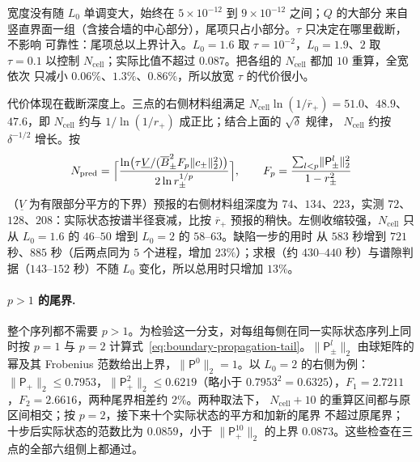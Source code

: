 
宽度没有随 $L_0$ 单调变大，始终在 $5\times10^{-12}$ 到 $9\times10^{-12}$ 之间；$Q$ 的大部分
来自竖直界面一组（含接合墙的中心部分），尾项只占小部分。$\tau$ 只决定在哪里截断，不影响
可靠性：尾项总以上界计入。$L_0=1.6$ 取 $\tau=10^{-2}$，$L_0=1.9$、$2$ 取 $\tau=0.1$ 以控制
$N_{\mathrm{cell}}$；实际比值不超过 $0.087$。把各组的 $N_{\mathrm{cell}}$ 都加 $10$ 重算，全宽依次
只减小 $0.06\%$、$1.3\%$、$0.86\%$，所以放宽 $\tau$ 的代价很小。

代价体现在截断深度上。三点的右侧材料组满足 $N_{\mathrm{cell}}\ln(1/\overline r_+)=51.0$、$48.9$、
$47.6$，即 $N_{\mathrm{cell}}$ 约与 $1/\ln(1/r_+)$ 成正比；结合上面的 $\sqrt\delta$ 规律，
$N_{\mathrm{cell}}$ 约按 $\delta^{-1/2}$ 增长。按
\[
  N_{\mathrm{pred}}=\Bigl\lceil\frac{\ln\bigl(\tau\underline V/(\overline B_\pm^2F_p\lVert c_\pm\rVert_2^2)\bigr)}{2\ln r_\pm^{1/p}}\Bigr\rceil,
  \qquad F_p=\frac{\sum_{l<p}\lVert\mathsf P_\pm^l\rVert_2^2}{1-r_\pm^2}
\]
（$\underline V$ 为有限部分平方的下界）预报的右侧材料组深度为 $74$、$134$、$223$，实测
$72$、$128$、$208$：实际状态按谱半径衰减，比按 $\overline r_+$ 预报的稍快。左侧收缩较强，$N_{\mathrm{cell}}$ 只从 $L_0=1.6$ 的 $46$--$50$ 增到 $L_0=2$ 的 $58$--$63$。缺陷一步的用时
从 $583$ 秒增到 $721$ 秒、$885$ 秒（后两点同为 $5$ 个进程，增加 $23\%$）；求根（约
$430$--$440$ 秒）与谱隙判据（$143$--$152$ 秒）不随 $L_0$ 变化，所以总用时只增加 $13\%$。

\paragraph{$p>1$ 的尾界.}
整个序列都不需要 $p>1$。为检验这一分支，对每组每侧在同一实际状态序列上同时按 $p=1$ 与
$p=2$ 计算式~\eqref{eq:boundary-propagation-tail}。$\lVert\mathsf P_\pm^l\rVert_2$ 由球矩阵的
幂及其 Frobenius 范数给出上界，$\lVert\mathsf P^0\rVert_2=1$。以 $L_0=2$ 的右侧为例：
$\lVert\mathsf P_+\rVert_2\le0.7953$，$\lVert\mathsf P_+^2\rVert_2\le0.6219$（略小于
$0.7953^2=0.6325$），$F_1=2.7211$，$F_2=2.6616$，两种尾界相差约 $2\%$。两种取法下，
$N_{\mathrm{cell}}+10$ 的重算区间都与原区间相交；按 $p=2$，接下来十个实际状态的平方和加新的尾界
不超过原尾界；十步后实际状态的范数比为 $0.0859$，小于 $\lVert\mathsf P_+^{10}\rVert_2$ 的上界
$0.0873$。这些检查在三点的全部六组侧上都通过。

